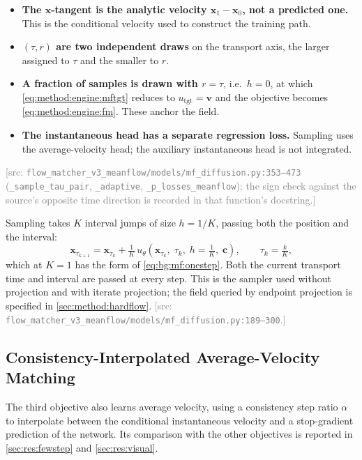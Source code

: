 \documentclass[headsepline,footsepline,footinclude=false,oneside,fontsize=11pt,paper=a4,listof=totoc,bibliography=totoc]{scrbook}
\theoremstyle{definition}
\theoremstyle{plain}
\theoremstyle{remark}
\newcommand{\vect}[1]{\boldsymbol{#1}}
\newcommand{\sidx}[1]{_{\textrm{#1}}}
\newcommand{\afield}{u}                        %
\newcommand{\ftime}{\tau}                      %
\newcommand{\nfe}{K}                           %
\newif\ifsubmission
\newcommand{\srcnote}[1]{\ifsubmission\else\textcolor{gray}{\footnotesize\textsf{[src: #1]}}\fi}
\begin{document}
\begin{itemize}
  \item \textbf{The $\vect{x}$-tangent is the analytic velocity $\vect{x}_{1}-\vect{x}_{0}$, not a
    predicted one.} This is the conditional velocity used to construct the training path.
  \item \textbf{$(\ftime,r)$ are two independent draws} on the transport axis, the larger
    assigned to $\ftime$ and the smaller to $r$.
  \item \textbf{A fraction of samples is drawn with $r = \ftime$}, i.e.\ $h=0$, at which
    \eqref{eq:method:engine:mftgt} reduces to $\afield\sidx{tgt} = \vect{v}$ and the objective
    becomes \eqref{eq:method:engine:fm}. These anchor the field.
  \item \textbf{The instantaneous head has a separate regression loss.} Sampling uses the
    average-velocity head; the auxiliary instantaneous head is not integrated.
\end{itemize}
\srcnote{\texttt{flow\_matcher\_v3\_meanflow/models/mf\_diffusion.py:353--473}
(\texttt{\_sample\_tau\_pair}, \texttt{\_adaptive}, \texttt{\_p\_losses\_meanflow}); the sign
check against the source's opposite time direction is recorded in that function's docstring.}

Sampling takes $\nfe$ interval jumps of size $h=1/\nfe$, passing both the position and the
interval:
\begin{equation}\label{eq:method:engine:mfsample}
  \vect{x}_{\ftime_{k+1}} = \vect{x}_{\ftime_{k}}
    + \tfrac{1}{\nfe}\,\afield_{\theta}\!\left(\vect{x}_{\ftime_{k}},\;\ftime_{k},\;h{=}\tfrac{1}{\nfe},\;\vect{c}\right),
  \qquad \ftime_{k} = \tfrac{k}{\nfe},
\end{equation}
which at $\nfe=1$ has the form of \eqref{eq:bg:mf:onestep}. Both the current transport time
and interval are passed at every step. This is the sampler used without projection and with iterate
projection; the field queried by endpoint projection is specified in \autoref{sec:method:hardflow}.
\srcnote{\texttt{flow\_matcher\_v3\_meanflow/models/mf\_diffusion.py:189--300}.}

\subsection{Consistency-Interpolated Average-Velocity Matching}\label{sec:method:alphaflow}

The third objective \parencite{zhang2025alphaflow} also learns average velocity, using a consistency
step ratio $\alpha$ to interpolate between the conditional instantaneous velocity and a
stop-gradient prediction of the network. Its comparison with the other objectives is reported in
\autoref{sec:res:fewstep} and \autoref{sec:res:visual}.
\end{document}
